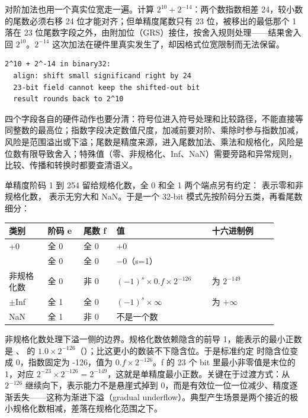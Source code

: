 对阶加法也用一个真实位宽走一遍。计算 $2^{10} + 2^{-14}$：两个数指数相差 24，较小数的尾数必须右移 24 位才能对齐；但单精度尾数只有 23 位，被移出的最低那个 1 落在 23 位尾数字段之外，由附加位（GRS）接住，按舍入规则处理——结果舍入回 $2^{10}$。$2^{-14}$ 这次加法在硬件里真实发生了，却因格式位宽限制而无法保留。

\begin{lstlisting}
2^10 + 2^-14 in binary32:
  align: shift small significand right by 24
  23-bit field cannot keep the shifted-out bit
  result rounds back to 2^10
\end{lstlisting}

四个字段各自的硬件动作也要分清：符号位进入符号处理和比较路径，不能直接等同整数的最高位；指数字段决定数值尺度，加减前要对阶、乘除时参与指数加减，风险是范围溢出或下溢；尾数是精度来源，进入尾数加法、乘法和规格化，风险是位数有限导致舍入；特殊值（零、非规格化、Inf、NaN）需要旁路和异常规则，比较、传播和转换时都要查清语义。

单精度阶码 1 到 254 留给规格化数，全 0 和全 1 两个端点另有约定： 表示零和非规格化数， 表示无穷大和 NaN。于是一个 32-bit 模式先按阶码分五类，再看尾数细分：

\begin{longtable}{L{0.13\linewidth}L{0.12\linewidth}L{0.11\linewidth}L{0.32\linewidth}L{0.22\linewidth}}
\toprule
类别 & 阶码 e & 尾数 f & 值 & 十六进制例 \\
\midrule
+0 & 全 0 & 全 0 & $+0$ &  \\ & 全 0 & 全 0 & $-0$（s=1） &  \\\tablerowrule
非规格化数 & 全 0 & 非 0 & $(-1)^{s} \times 0.f \times 2^{-126}$ &  为 $2^{-149}$ \\\tablerowrule
$\pm$Inf & 全 1 & 全 0 & $(-1)^{s} \times \infty$ &  为 $+\infty$ \\\tablerowrule
NaN & 全 1 & 非 0 & 不是一个数 &  \\
\bottomrule
\end{longtable}

非规格化数处理下溢一侧的边界。规格化数依赖隐含的前导 1，能表示的最小正数是 、 的 $1.0 \times 2^{-126}$（）；比这更小的数装不下隐含位。于是标准约定  时隐含位变成 0，指数固定为 -126，值为 $0.f \times 2^{-126}$。f 的 23 个 bit 里最小非零值是末位的 1，对应 $2^{-23} \times 2^{-126} = 2^{-149}$，这就是单精度最小正数。关键在于过渡方式：从 $2^{-126}$ 继续向下，表示能力不是悬崖式掉到 0，而是有效位一位一位减少、精度逐渐丢失——这称为渐进下溢（gradual underflow）。典型产生场景是两个接近的极小规格化数相减，差落在规格化范围之下。


